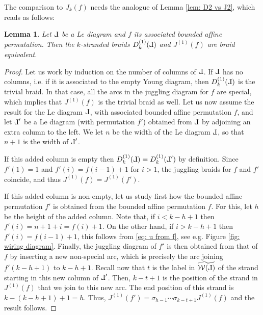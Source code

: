\documentclass[10pt]{amsart}
\theoremstyle{plain}
\newtheorem{lemma}[thm]{Lemma}
\theoremstyle{definition}
\theoremstyle{remark}
\numberwithin{equation}{section}
\newcommand{\Ja}{J^{(1)}}
\newcommand{\wire}[1]{\mathcal{W}(#1)}
\def\Le{\reflectbox{$\mathrm{L}$}}
\begin{document}
\noindent The comparison to $J_k(f)$ needs the analogue of Lemma \ref{lem: D2 vs J2}, which reads as follows:

\begin{lemma}\label{lem: D1 vs J1}
Let $\Le$ be a Le diagram and $f$ its associated bounded affine permutation. Then the $k$-stranded braids $D^{(1)}_{k}(\Le)$ and $\Ja(f)$ are braid equivalent. 
\end{lemma}
\begin{proof}
 Let us work by induction on the number of columns of $\Le$. If $\Le$ has no columns, i.e. if it is associated to the empty Young diagram, then $D^{(1)}_{k}(\Le)$ is the trivial braid. In that case, all the arcs in the juggling diagram for $f$ are special, which implies that $\Ja(f)$ is the trivial braid as well. Let us now assume the result for the Le diagram $\Le$, with associated bounded affine permutation $f$, and let $\Le'$ be a Le diagram (with permutation $f'$) obtained from $\Le$ by adjoining an extra column to the left. We let $n$ be the width of the Le diagram $\Le$, so that $n+1$ is the width of $\Le'$.
 
 \noindent If this added column is empty then $D^{(1)}_{k}(\Le) = D^{(1)}_{k}(\Le')$  by definition. Since $f'(1) = 1$ and $f'(i) = f(i-1) + 1$ for $i > 1$, the juggling braids for $f$ and $f'$ coincide, and thus $\Ja(f) = \Ja(f')$.
 
\noindent If this added column is non-empty, let us study first how the bounded affine permutation $f'$ is obtained from the bounded affine permutation $f$. For this, let $h$ be the height of the added column. Note that, if $i < k-h+1$ then $f'(i) = n+1+i = f(i) + 1$. On the other hand, if $i > k-h+1$ then $f'(i) = f(i-1)+1$, this follows from \eqref{eq: u from f}, see e.g. Figure \ref{fig: wiring diagram}. Finally, the juggling diagram of $f'$ is then obtained from that of $f$ by inserting a new non-special arc, which is precisely the arc joining $f'(k-h+1)$ to $k-h+1$. Recall now that $t$ is the label in $\widetilde{\wire{\Le}}$ of the strand starting in this new column of $\Le'$. Then, $k-t+1$ is the position of the strand in $J^{(1)}(f)$ that we join to this new arc. The end position of this strand is $k-(k-h+1) + 1 = h$. Thus, $J^{(1)}(f') = \sigma_{h-1}\cdots \sigma_{k-t+1}J^{(1)}(f)$ and the result follows.
\end{proof}
\end{document}

